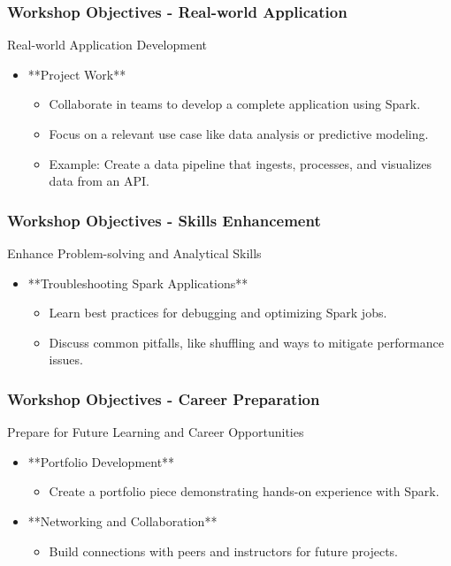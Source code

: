 \documentclass[aspectratio=169]{beamer}
\begin{document}
\begin{frame}[fragile]
    \frametitle{Workshop Objectives - Real-world Application}
    \begin{block}{Real-world Application Development}
        \begin{itemize}
            \item **Project Work**
                \begin{itemize}
                    \item Collaborate in teams to develop a complete application using Spark.
                    \item Focus on a relevant use case like data analysis or predictive modeling.
                    \item Example: Create a data pipeline that ingests, processes, and visualizes data from an API.
                \end{itemize}
        \end{itemize}
    \end{block}
\end{frame}

\begin{frame}[fragile]
    \frametitle{Workshop Objectives - Skills Enhancement}
    \begin{block}{Enhance Problem-solving and Analytical Skills}
        \begin{itemize}
            \item **Troubleshooting Spark Applications**
                \begin{itemize}
                    \item Learn best practices for debugging and optimizing Spark jobs.
                    \item Discuss common pitfalls, like shuffling and ways to mitigate performance issues.
                \end{itemize}
        \end{itemize}
    \end{block}
\end{frame}

\begin{frame}[fragile]
    \frametitle{Workshop Objectives - Career Preparation}
    \begin{block}{Prepare for Future Learning and Career Opportunities}
        \begin{itemize}
            \item **Portfolio Development**
                \begin{itemize}
                    \item Create a portfolio piece demonstrating hands-on experience with Spark.
                \end{itemize}
            \item **Networking and Collaboration**
                \begin{itemize}
                    \item Build connections with peers and instructors for future projects.
                \end{itemize}
        \end{itemize}
    \end{block}
\end{frame}
\end{document}
